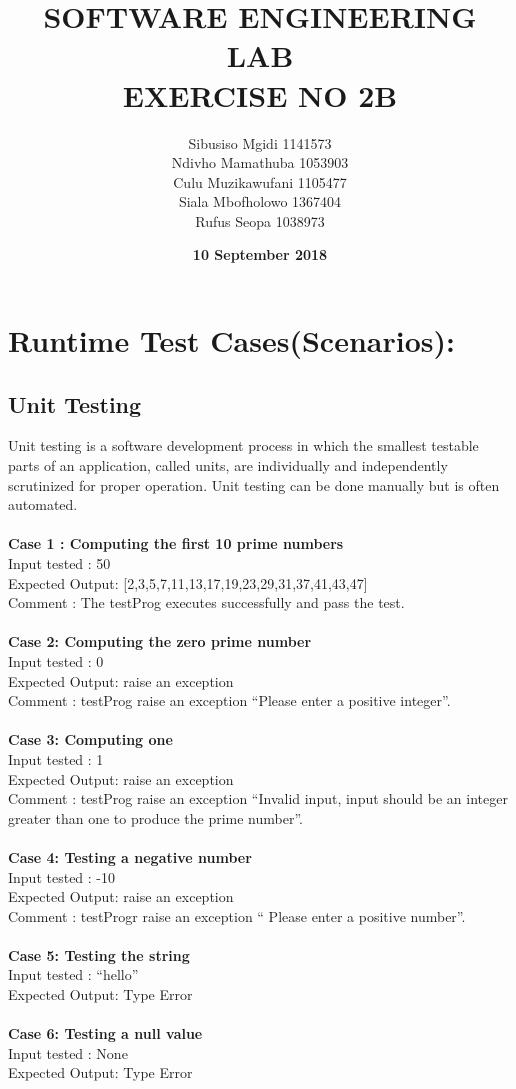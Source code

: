 \documentclass[12pt]{article}
\title{\textbf{SOFTWARE ENGINEERING LAB \\EXERCISE NO 2B\\}}
\author{\Large Sibusiso Mgidi 1141573\\
		\Large Ndivho Mamathuba 1053903\\
		\Large Culu Muzikawufani 1105477\\	
		\Large Siala Mbofholowo 1367404\\
		\Large Rufus Seopa 1038973\\
		}
\date{\textbf{\Large 10 September 2018}}
\begin{document}
\linespread{1.5}
\newpage
\section{Runtime Test Cases(Scenarios):}
\subsection{Unit Testing}
Unit testing is a software development process in which the smallest testable parts of an application, called units, are individually and independently scrutinized for proper operation. Unit testing can be done manually but is often automated.\\
\\
\textbf {Case 1 : Computing the first 10 prime numbers} \\
Input tested : 50\\
Expected Output: [2,3,5,7,11,13,17,19,23,29,31,37,41,43,47]\\
Comment : The testProg executes successfully and pass the test.\\
\\
\textbf {Case 2: Computing the zero prime number }\\
Input tested : 0 \\
Expected Output: raise an exception \\
Comment : testProg raise an exception “Please enter a positive integer”.\\
\\
\textbf {Case 3: Computing one}\\
Input tested : 1\\
Expected Output: raise an exception\\
Comment : testProg raise an exception “Invalid input, input should be an integer greater than one to produce the prime number”.\\
\\
\textbf {Case 4: Testing a negative number}\\
Input tested : -10\\
Expected Output: raise an exception\\
Comment : testProgr raise an exception “ Please enter a positive number”.\\
\\
\textbf {Case 5: Testing the string }\\
Input tested : “hello”\\
Expected Output: Type Error\\
\\
\textbf {Case 6: Testing a null value}\\
Input tested : None\\
Expected Output: Type Error\\
\end{document}
